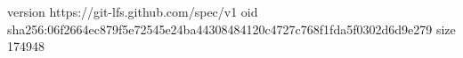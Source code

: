 version https://git-lfs.github.com/spec/v1
oid sha256:06f2664ec879f5e72545e24ba44308484120c4727c768f1fda5f0302d6d9e279
size 174948
